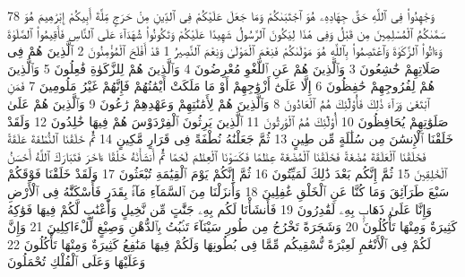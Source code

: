 {\tiny\colorbox{cl_aya}{78}} وَجَٰهِدُوا۟ فِى ٱللَّهِ حَقَّ جِهَادِهِۦ هُوَ ٱجْتَبَىٰكُمْ وَمَا جَعَلَ عَلَيْكُمْ فِى ٱلدِّينِ مِنْ حَرَجٍ مِّلَّةَ أَبِيكُمْ إِبْرَٰهِيمَ هُوَ سَمَّىٰكُمُ ٱلْمُسْلِمِينَ مِن قَبْلُ وَفِى هَٰذَا لِيَكُونَ ٱلرَّسُولُ شَهِيدًا عَلَيْكُمْ وَتَكُونُوا۟ شُهَدَآءَ عَلَى ٱلنَّاسِ فَأَقِيمُوا۟ ٱلصَّلَوٰةَ وَءَاتُوا۟ ٱلزَّكَوٰةَ وَٱعْتَصِمُوا۟ بِٱللَّهِ هُوَ مَوْلَىٰكُمْ فَنِعْمَ ٱلْمَوْلَىٰ وَنِعْمَ ٱلنَّصِيرُ
{\tiny\colorbox{cl_aya}{1}} قَدْ أَفْلَحَ ٱلْمُؤْمِنُونَ
{\tiny\colorbox{cl_aya}{2}} ٱلَّذِينَ هُمْ فِى صَلَاتِهِمْ خَٰشِعُونَ
{\tiny\colorbox{cl_aya}{3}} وَٱلَّذِينَ هُمْ عَنِ ٱللَّغْوِ مُعْرِضُونَ
{\tiny\colorbox{cl_aya}{4}} وَٱلَّذِينَ هُمْ لِلزَّكَوٰةِ فَٰعِلُونَ
{\tiny\colorbox{cl_aya}{5}} وَٱلَّذِينَ هُمْ لِفُرُوجِهِمْ حَٰفِظُونَ
{\tiny\colorbox{cl_aya}{6}} إِلَّا عَلَىٰٓ أَزْوَٰجِهِمْ أَوْ مَا مَلَكَتْ أَيْمَٰنُهُمْ فَإِنَّهُمْ غَيْرُ مَلُومِينَ
{\tiny\colorbox{cl_aya}{7}} فَمَنِ ٱبْتَغَىٰ وَرَآءَ ذَٰلِكَ فَأُو۟لَٰٓئِكَ هُمُ ٱلْعَادُونَ
{\tiny\colorbox{cl_aya}{8}} وَٱلَّذِينَ هُمْ لِأَمَٰنَٰتِهِمْ وَعَهْدِهِمْ رَٰعُونَ
{\tiny\colorbox{cl_aya}{9}} وَٱلَّذِينَ هُمْ عَلَىٰ صَلَوَٰتِهِمْ يُحَافِظُونَ
{\tiny\colorbox{cl_aya}{10}} أُو۟لَٰٓئِكَ هُمُ ٱلْوَٰرِثُونَ
{\tiny\colorbox{cl_aya}{11}} ٱلَّذِينَ يَرِثُونَ ٱلْفِرْدَوْسَ هُمْ فِيهَا خَٰلِدُونَ
{\tiny\colorbox{cl_aya}{12}} وَلَقَدْ خَلَقْنَا ٱلْإِنسَٰنَ مِن سُلَٰلَةٍ مِّن طِينٍ
{\tiny\colorbox{cl_aya}{13}} ثُمَّ جَعَلْنَٰهُ نُطْفَةً فِى قَرَارٍ مَّكِينٍ
{\tiny\colorbox{cl_aya}{14}} ثُمَّ خَلَقْنَا ٱلنُّطْفَةَ عَلَقَةً فَخَلَقْنَا ٱلْعَلَقَةَ مُضْغَةً فَخَلَقْنَا ٱلْمُضْغَةَ عِظَٰمًا فَكَسَوْنَا ٱلْعِظَٰمَ لَحْمًا ثُمَّ أَنشَأْنَٰهُ خَلْقًا ءَاخَرَ فَتَبَارَكَ ٱللَّهُ أَحْسَنُ ٱلْخَٰلِقِينَ
{\tiny\colorbox{cl_aya}{15}} ثُمَّ إِنَّكُم بَعْدَ ذَٰلِكَ لَمَيِّتُونَ
{\tiny\colorbox{cl_aya}{16}} ثُمَّ إِنَّكُمْ يَوْمَ ٱلْقِيَٰمَةِ تُبْعَثُونَ
{\tiny\colorbox{cl_aya}{17}} وَلَقَدْ خَلَقْنَا فَوْقَكُمْ سَبْعَ طَرَآئِقَ وَمَا كُنَّا عَنِ ٱلْخَلْقِ غَٰفِلِينَ
{\tiny\colorbox{cl_aya}{18}} وَأَنزَلْنَا مِنَ ٱلسَّمَآءِ مَآءًۢ بِقَدَرٍ فَأَسْكَنَّٰهُ فِى ٱلْأَرْضِ وَإِنَّا عَلَىٰ ذَهَابٍۭ بِهِۦ لَقَٰدِرُونَ
{\tiny\colorbox{cl_aya}{19}} فَأَنشَأْنَا لَكُم بِهِۦ جَنَّٰتٍ مِّن نَّخِيلٍ وَأَعْنَٰبٍ لَّكُمْ فِيهَا فَوَٰكِهُ كَثِيرَةٌ وَمِنْهَا تَأْكُلُونَ
{\tiny\colorbox{cl_aya}{20}} وَشَجَرَةً تَخْرُجُ مِن طُورِ سَيْنَآءَ تَنۢبُتُ بِٱلدُّهْنِ وَصِبْغٍ لِّلْءَاكِلِينَ
{\tiny\colorbox{cl_aya}{21}} وَإِنَّ لَكُمْ فِى ٱلْأَنْعَٰمِ لَعِبْرَةً نُّسْقِيكُم مِّمَّا فِى بُطُونِهَا وَلَكُمْ فِيهَا مَنَٰفِعُ كَثِيرَةٌ وَمِنْهَا تَأْكُلُونَ
{\tiny\colorbox{cl_aya}{22}} وَعَلَيْهَا وَعَلَى ٱلْفُلْكِ تُحْمَلُونَ
